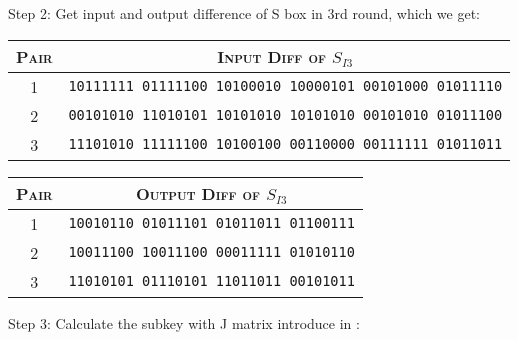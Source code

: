 \documentclass[a4paper,10pt]{article}
\begin{document}
\noindent\textsf{Step 2:} Get input and output difference of S box in 3rd round, which we get:
\begin{center}\begin{longtable}{c|c}
\hline
\textsc{Pair} & \textsc{Input Diff of $S_{I3}$}\\
\hline
1&\texttt{10111111 01111100 10100010 10000101 00101000 01011110}\\
\hline
2&\texttt{00101010 11010101 10101010 10101010 00101010 01011100}\\
\hline
3&\texttt{11101010 11111100 10100100 00110000 00111111 01011011}\\
\hline
\end{longtable}\end{center}

\begin{center}\begin{longtable}{c|c}
\hline
\textsc{Pair} & \textsc{Output Diff of $S_{I3}$}\\
\hline
1&\texttt{10010110 01011101 01011011 01100111}\\
\hline
2&\texttt{10011100 10011100 00011111 01010110}\\
\hline
3&\texttt{11010101 01110101 11011011 00101011}\\
\hline
\end{longtable}\end{center}

\noindent\textsf{Step 3:} Calculate the subkey with J matrix introduce in \cite{FENG00}:
\end{document}
